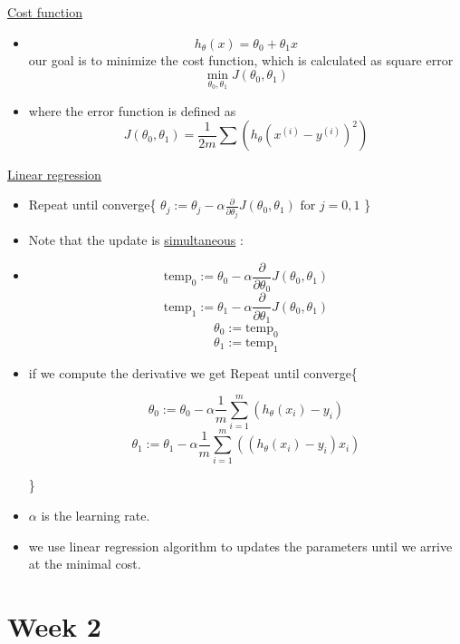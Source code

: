 \documentclass[12pt]{article}
\begin{document}
\underline{Cost function}\\
\begin{itemize}
	\item \[h_{\theta}(x) = \theta_0 + \theta_1x\]
	 our goal is to minimize the cost function, which is calculated as square error
	 \[\min_{\theta_0,\theta_1} J(\theta_0,\theta_1)\]
	\item where the error function is defined as
	 \[J(\theta_0,\theta_1) = \frac{1}{2m} \sum_{}^{}(h_\theta(x^{(i)} - y ^{(i)})^2)\]
\end{itemize}

\underline{Linear regression}
\begin{center}
	\begin{itemize}
		\item 	Repeat until converge\{
		$  \theta_j := \theta_j - \alpha\frac{\partial}{\partial \theta_j}J(\theta_0,\theta_1) \text{ for } j = 0,1 $ \}	
		\item  Note that the update is \underline{simultaneous} :
		\item 
		\[ \text{temp}_0 := \theta_0 - \alpha\frac{\partial}{\partial \theta_0}J(\theta_0,\theta_1) \] 
		\[ \text{temp}_1 := \theta_1 - \alpha\frac{\partial}{\partial \theta_1}J(\theta_0,\theta_1) \]
		\[\theta_0 := \text{temp}_0 \]
		\[\theta_1 := \text{temp}_1\]
		\item if we compute the derivative we get
		Repeat until converge\{
		
		\[ \theta_0 := \theta_0 - \alpha\frac{1}{m}\sum_{i=1}^{m}(h_{\theta}(x_i)-y_i) \] 
		\[ \theta_1 := \theta_1 - \alpha\frac{1}{m}\sum_{i=1}^{m}((h_{\theta}(x_i)-y_i) x_i)\] 
		
		\}	
		
		\item $\alpha$ is the learning rate. 
		\item we use linear regression algorithm to updates the parameters until we arrive at the minimal cost.
	\end{itemize}

\end{center}

\section*{Week 2}
\end{document}
